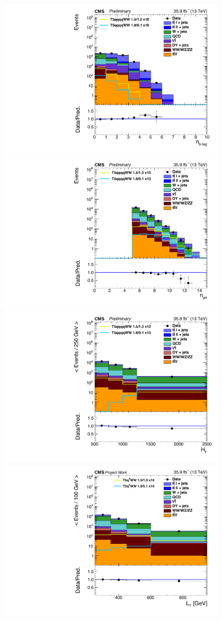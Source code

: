  \begin{figure}[!hbt]
    \begin{center}
 \includegraphics[width=0.45 \textwidth]{Plots/analysis/control_Plots/nBjet0b}
 \includegraphics[width=0.45 \textwidth]{Plots/analysis/control_Plots/plots_zerob_st250_ht500_njet5_nbtagEq0_nJet30Preliminary}\\
 \includegraphics[width=0.45 \textwidth]{Plots/analysis/control_Plots/plots_zerob_st250_ht500_njet5_nbtagEq0_htJet30jPreliminary}
 \includegraphics[width=0.45 \textwidth]{Plots/analysis/control_Plots/LT_colors}

\end{center}
\end{figure}
